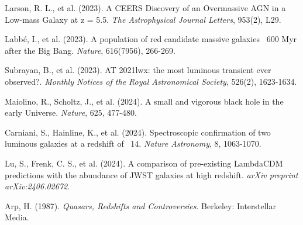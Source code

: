 \documentclass[pdflatex,sn-mathphys-num]{sn-jnl}
\begin{document}
\begin{thebibliography}{99}
Larson, R. L., et al. (2023). A CEERS Discovery of an Overmassive AGN in a Low-mass Galaxy at z = 5.5. \textit{The Astrophysical Journal Letters}, 953(2), L29.

Labbé, I., et al. (2023). A population of red candidate massive galaxies ~600 Myr after the Big Bang. \textit{Nature}, 616(7956), 266-269.

Subrayan, B., et al. (2023). AT 2021lwx: the most luminous transient ever observed?. \textit{Monthly Notices of the Royal Astronomical Society}, 526(2), 1623-1634.

Maiolino, R., Scholtz, J., et al. (2024). A small and vigorous black hole in the early Universe. \textit{Nature}, 625, 477-480.

Carniani, S., Hainline, K., et al. (2024). Spectroscopic confirmation of two luminous galaxies at a redshift of ~14. \textit{Nature Astronomy}, 8, 1063-1070.

Lu, S., Frenk, C. S., et al. (2024). A comparison of pre-existing LambdaCDM predictions with the abundance of JWST galaxies at high redshift. \textit{arXiv preprint arXiv:2406.02672}.

Arp, H. (1987). \textit{Quasars, Redshifts and Controversies}. Berkeley: Interstellar Media.

\end{thebibliography}
\end{document}
